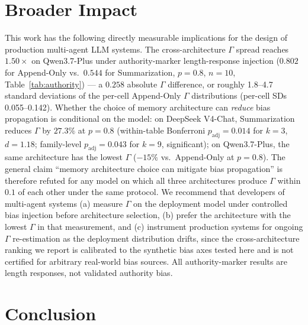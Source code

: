\documentclass[11pt]{article}
\begin{document}
\section{Broader Impact}

This work has the following directly measurable implications for the design of production multi-agent LLM systems. The cross-architecture $\Gamma$ spread reaches $1.50\times$ on Qwen3.7-Plus under authority-marker length-response injection ($0.802$ for Append-Only vs.\ $0.544$ for Summarization, $p=0.8$, $n{=}10$, Table~\ref{tab:authority}) --- a $0.258$ absolute $\Gamma$ difference, or roughly 1.8--4.7 standard deviations of the per-cell Append-Only $\Gamma$ distributions (per-cell SDs 0.055--0.142). Whether the choice of memory architecture can \emph{reduce} bias propagation is conditional on the model: on DeepSeek V4-Chat, Summarization reduces $\Gamma$ by $27.3\%$ at $p=0.8$ (within-table Bonferroni $p_{\text{adj}}=0.014$ for $k=3$, $d=1.18$; family-level $p_{\text{adj}}=0.043$ for $k=9$, significant); on Qwen3.7-Plus, the same architecture has the lowest $\Gamma$ ($-15\%$ vs.\ Append-Only at $p{=}0.8$). The general claim ``memory architecture choice can mitigate bias propagation'' is therefore refuted for any model on which all three architectures produce $\Gamma$ within $0.1$ of each other under the same protocol. We recommend that developers of multi-agent systems (a) measure $\Gamma$ on the deployment model under controlled bias injection before architecture selection, (b) prefer the architecture with the lowest $\Gamma$ in that measurement, and (c) instrument production systems for ongoing $\Gamma$ re-estimation as the deployment distribution drifts, since the cross-architecture ranking we report is calibrated to the synthetic bias axes tested here and is not certified for arbitrary real-world bias sources. All authority-marker results are length responses, not validated authority bias.

\section{Conclusion}
\end{document}
